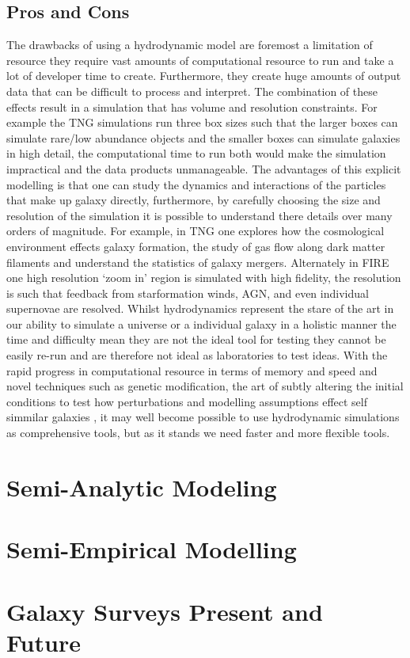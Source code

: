 \subsection{Pros and Cons}
The drawbacks of using a hydrodynamic model are foremost a limitation of resource they require vast amounts of computational resource to run and take a lot of developer time to create. Furthermore, they create huge amounts of output data that can be difficult to process and interpret. The combination of these effects result in a simulation that has volume and resolution constraints. For example the TNG simulations run three box sizes such that the larger boxes can simulate rare/low abundance objects and the smaller boxes can simulate galaxies in high detail, the computational time to run both would make the simulation impractical and the data products unmanageable. The advantages of this explicit modelling is that one can study the dynamics and interactions of the particles that make up galaxy directly, furthermore, by carefully choosing the size and resolution of the simulation it is possible to understand there details over many orders of magnitude. For example, in TNG one explores how the cosmological environment effects galaxy formation, the study of gas flow along dark matter filaments and understand the statistics of galaxy mergers. Alternately in FIRE one high resolution `zoom in' region is simulated with high fidelity, the resolution is such that feedback from starformation winds, AGN, and even individual supernovae are resolved. Whilst hydrodynamics represent the stare of the art in our ability to simulate a universe or a individual galaxy in a holistic manner the time and difficulty mean they are not the ideal tool for testing they cannot be easily re-run and are therefore not ideal as laboratories to test ideas. With the rapid progress in computational resource in terms of memory and speed and novel techniques such as genetic modification, the art of subtly altering the initial conditions to test how perturbations and modelling assumptions effect self simmilar galaxies \citep{Pontzen2017HowGalaxy}, it may well become possible to use hydrodynamic simulations as comprehensive tools, but as it stands we need faster and more flexible tools.  

\section{Semi-Analytic Modeling}
\label{sec:SAM}



\section{Semi-Empirical Modelling}
\label{sec:SEM}



\section{Galaxy Surveys Present and Future}
\label{sec:Surveys}





